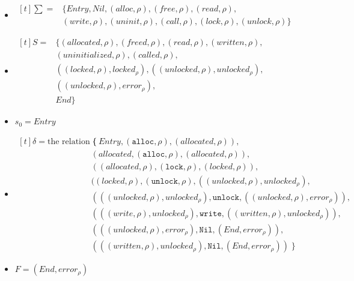 \begin{itemize}
    \item{
        $
            \begin{aligned}[t] 
                \sum = & \{\mathit{Entry}, \mathit{Nil}, (alloc, \rho), (free, \rho), (read, \rho), \\ 
                & (write, \rho), (uninit, \rho), (call, \rho), (lock, \rho), (unlock, \rho)\}
            \end{aligned} 
        $
    }
    \item{
        $
            \begin{aligned}[t]
                S = & \{(allocated, \rho), (freed, \rho), (read, \rho), (written, \rho),\\ 
                & (uninitialized, \rho), (called, \rho), \\
                & ((locked, \rho), locked_\rho), ((unlocked, \rho), unlocked_\rho), \\
                & ((unlocked, \rho), error_\rho), \\
                & End\}
            \end{aligned}
        $
    }
    \item $s_0 = Entry$ 
    \item {
        $
            \begin{aligned}[t]
            \delta = \text{the relation} \; \{ \; & (Entry, (\texttt{alloc},\rho), (allocated, \rho)), \\ 
            & (allocated, (\texttt{alloc},\rho), (allocated, \rho)), \\ 
            & ((allocated, \rho), (\texttt{lock}, \rho), (locked, \rho)), \\
            & ((locked, \rho), (\texttt{unlock}, \rho), ((unlocked, \rho), unlocked_\rho), \\
            & (((unlocked, \rho), unlocked_\rho), \texttt{unlock}, ((unlocked, \rho), error_\rho)), \\ 
            & (((write, \rho), unlocked_\rho), \texttt{write}, ((written, \rho), unlocked_\rho)), \\ 
            & (((unlocked, \rho), error_\rho), \texttt{Nil}, (End, error_\rho)), \\ 
            & (((written, \rho), unlocked_\rho), \texttt{Nil}, (End, error_\rho)) \; \}
            \end{aligned}
        $ 
    }
    \item $F = (End, error_\rho)$  
\end{itemize}

